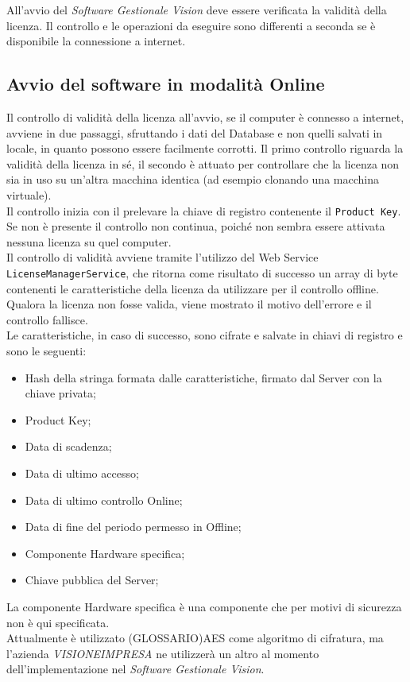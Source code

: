 All’avvio del \textit{Software Gestionale Vision} deve essere verificata la validità della licenza. Il controllo e le operazioni da eseguire sono differenti a seconda se è disponibile la connessione a internet. 

\subsection{Avvio del software in modalità Online}

Il controllo di validità della licenza all'avvio, se il computer è connesso a internet, avviene in due passaggi, sfruttando i dati del Database e non quelli salvati in locale, in quanto possono essere facilmente corrotti. Il primo controllo riguarda la validità della licenza in sé, il secondo è attuato per controllare che la licenza non sia in uso su un'altra macchina identica (ad esempio clonando una macchina virtuale).\\
Il controllo inizia con il prelevare la chiave di registro contenente il \texttt{Product Key}. Se non è presente il controllo non continua, poiché non sembra essere attivata nessuna licenza su quel computer.\\  
Il controllo di validità avviene tramite l'utilizzo del Web Service \texttt{LicenseManagerService}, che ritorna come risultato di successo un array di byte contenenti le caratteristiche della licenza da utilizzare per il controllo offline. Qualora la licenza non fosse valida, viene mostrato il motivo dell’errore e il controllo fallisce.
\\Le caratteristiche, in caso di successo, sono cifrate e salvate in chiavi di registro e sono le seguenti: 
\begin{itemize}
\item Hash della stringa formata dalle caratteristiche, firmato dal Server con la chiave privata;
\item Product Key;
\item Data di scadenza;
\item Data di ultimo accesso;
\item Data di ultimo controllo Online;
\item Data di fine del periodo permesso in Offline;
\item Componente Hardware specifica;
\item Chiave pubblica del Server;
\end{itemize}

La componente Hardware specifica è una componente che per motivi di sicurezza non è qui specificata.\\
Attualmente è utilizzato (GLOSSARIO)AES come algoritmo di cifratura, ma l'azienda \textit{VISIONEIMPRESA} ne utilizzerà un altro al momento dell'implementazione nel \textit{Software Gestionale Vision}.

